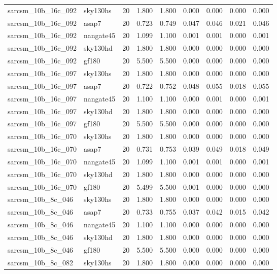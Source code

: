 \begin{tabular}{llrrrrrrr}
sarcsm\_10b\_16c\_092 & sky130hs & 20 & 1.800 & 1.800 & 0.000 & 0.000 & 0.000 & 0.000 \\
sarcsm\_10b\_16c\_092 & asap7 & 20 & 0.723 & 0.749 & 0.047 & 0.046 & 0.021 & 0.046 \\
sarcsm\_10b\_16c\_092 & nangate45 & 20 & 1.099 & 1.100 & 0.001 & 0.001 & 0.000 & 0.001 \\
sarcsm\_10b\_16c\_092 & sky130hd & 20 & 1.800 & 1.800 & 0.000 & 0.000 & 0.000 & 0.000 \\
sarcsm\_10b\_16c\_092 & gf180 & 20 & 5.500 & 5.500 & 0.000 & 0.000 & 0.000 & 0.000 \\
sarcsm\_10b\_16c\_097 & sky130hs & 20 & 1.800 & 1.800 & 0.000 & 0.000 & 0.000 & 0.000 \\
sarcsm\_10b\_16c\_097 & asap7 & 20 & 0.722 & 0.752 & 0.048 & 0.055 & 0.018 & 0.055 \\
sarcsm\_10b\_16c\_097 & nangate45 & 20 & 1.100 & 1.100 & 0.000 & 0.001 & 0.000 & 0.001 \\
sarcsm\_10b\_16c\_097 & sky130hd & 20 & 1.800 & 1.800 & 0.000 & 0.000 & 0.000 & 0.000 \\
sarcsm\_10b\_16c\_097 & gf180 & 20 & 5.500 & 5.500 & 0.000 & 0.000 & 0.000 & 0.000 \\
sarcsm\_10b\_16c\_070 & sky130hs & 20 & 1.800 & 1.800 & 0.000 & 0.000 & 0.000 & 0.000 \\
sarcsm\_10b\_16c\_070 & asap7 & 20 & 0.731 & 0.753 & 0.039 & 0.049 & 0.018 & 0.049 \\
sarcsm\_10b\_16c\_070 & nangate45 & 20 & 1.099 & 1.100 & 0.001 & 0.001 & 0.000 & 0.001 \\
sarcsm\_10b\_16c\_070 & sky130hd & 20 & 1.800 & 1.800 & 0.000 & 0.000 & 0.000 & 0.000 \\
sarcsm\_10b\_16c\_070 & gf180 & 20 & 5.499 & 5.500 & 0.001 & 0.000 & 0.000 & 0.000 \\
sarcsm\_10b\_8c\_046 & sky130hs & 20 & 1.800 & 1.800 & 0.000 & 0.000 & 0.000 & 0.000 \\
sarcsm\_10b\_8c\_046 & asap7 & 20 & 0.733 & 0.755 & 0.037 & 0.042 & 0.015 & 0.042 \\
sarcsm\_10b\_8c\_046 & nangate45 & 20 & 1.100 & 1.100 & 0.000 & 0.000 & 0.000 & 0.000 \\
sarcsm\_10b\_8c\_046 & sky130hd & 20 & 1.800 & 1.800 & 0.000 & 0.000 & 0.000 & 0.000 \\
sarcsm\_10b\_8c\_046 & gf180 & 20 & 5.500 & 5.500 & 0.000 & 0.000 & 0.000 & 0.000 \\
sarcsm\_10b\_8c\_082 & sky130hs & 20 & 1.800 & 1.800 & 0.000 & 0.000 & 0.000 & 0.000 \\

\end{tabular}
